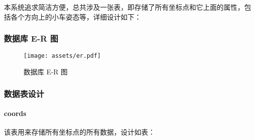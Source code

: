 本系统追求简洁方便，总共涉及一张表，即存储了所有坐标点和它上面的属性，包括各个方向上的小车姿态等，详细设计如下：

\subsubsection{数据库 E-R 图}

\begin{figure}[H]
  \centering
  \texttt{[image: assets/er.pdf]}
  \caption{数据库 E-R 图}
  \label{fig:er}
\end{figure}

\subsubsection{数据表设计}

\paragraph{coords}

该表用来存储所有坐标点的所有数据，设计如表：

